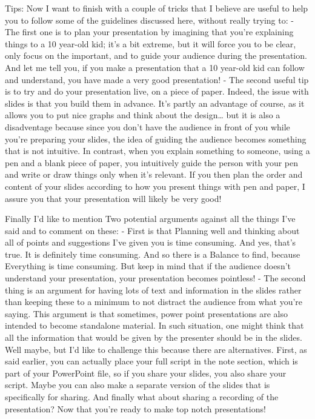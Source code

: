 \documentclass[
]{book}
\begin{document}
Tips:
Now I want to finish with a couple of tricks that I believe are useful to help you to follow some of the guidelines discussed here, without really trying to:
- The first one is to plan your presentation by imagining that you're explaining things to a 10 year-old kid; it's a bit extreme, but it will force you to be clear, only focus on the important, and to guide your audience during the presentation. And let me tell you, if you make a presentation that a 10 year-old kid can follow and understand, you have made a very good presentation!
- The second useful tip is to try and do your presentation live, on a piece of paper. Indeed, the issue with slides is that you build them in advance. It's partly an advantage of course, as it allows you to put nice graphs and think about the design\ldots{} but it is also a disadventage because since you don't have the audience in front of you while you're preparing your slides, the idea of guiding the audience becomes something that is not intuitive. In contrast, when you explain something to someone, using a pen and a blank piece of paper, you intuitively guide the person with your pen and write or draw things only when it's relevant. If you then plan the order and content of your slides according to how you present things with pen and paper, I assure you that your presentation will likely be very good!

Finally I'd like to mention Two potential arguments against all the things I've said and to comment on these:
- First is that Planning well and thinking about all of points and suggestions I've given you is time consuming. And yes, that's true. It is definitely time consuming. And so there is a Balance to find, because Everything is time consuming. But keep in mind that if the audience doesn't understand your presentation, your presentation becomes pointless!
- The second thing is an argument for having lots of text and information in the slides rather than keeping these to a minimum to not distract the audience from what you're saying. This argument is that sometimes, power point presentations are also intended to become standalone material. In such situation, one might think that all the information that would be given by the presenter should be in the slides. Well maybe, but I'd like to challenge this because there are alternatives. First, as said earlier, you can actually place your full script in the note section, which is part of your PowerPoint file, so if you share your slides, you also share your script. Maybe you can also make a separate version of the slides that is specifically for sharing. And finally what about sharing a recording of the presentation? Now that you're ready to make top notch presentations!
\end{document}
